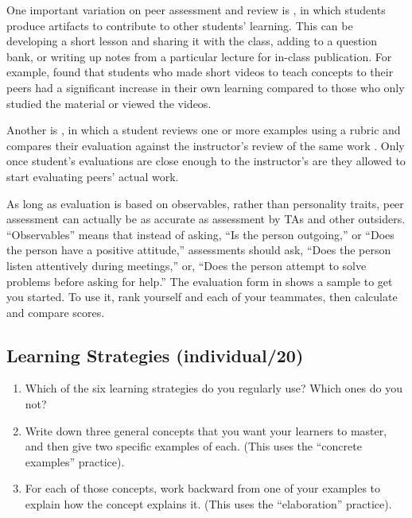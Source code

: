 One important variation on peer assessment and review is , in which students produce
artifacts to contribute to other students' learning. This can be
developing a short lesson and sharing it with the class, adding to a
question bank, or writing up notes from a particular lecture for
in-class publication. For example, \cite{Fran2018} found that
students who made short videos to teach concepts to their peers had a
significant increase in their own learning compared to those who only
studied the material or viewed the videos.

Another is , in
which a student reviews one or more examples using a rubric and
compares their evaluation against the instructor's review of the same
work \cite{Kulk2013}. Only once student's evaluations are close
enough to the instructor's are they allowed to start evaluating peers'
actual work.

As long as evaluation is based on observables, rather than personality
traits, peer assessment can actually be as accurate as assessment by TAs
and other outsiders. ``Observables'' means that instead of asking, ``Is the
person outgoing,'' or ``Does the person have a positive attitude,''
assessments should ask, ``Does the person listen attentively during
meetings,'' or, ``Does the person attempt to solve problems before asking
for help.'' The evaluation form in  shows a
sample to get you started. To use it, rank yourself and each of your
teammates, then calculate and compare scores.


\subsection*{Learning Strategies (individual/20)}

\begin{enumerate}
\item
  Which of the six learning strategies do you regularly use? Which
  ones do you not?
\item
  Write down three general concepts that you want your learners to
  master, and then give two specific examples of each. (This uses the
  ``concrete examples'' practice).
\item
  For each of those concepts, work backward from one of your examples
  to explain how the concept explains it. (This uses the ``elaboration''
  practice).
\end{enumerate}

